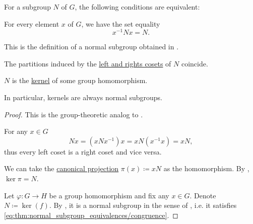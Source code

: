 \begin{proposition}\label{thm:normal_subgroup_equivalences}
  For a subgroup \( N \) of \( G \), the following conditions are equivalent:
  \begin{thmenum}
     For every element \( x \) of \( G \), we have the set equality
    \begin{equation}\label{eq:thm:normal_subgroup_equivalences/congruence}
      x^{-1} N x = N.
    \end{equation}

    This is the definition of a normal subgroup obtained in .

     The partitions induced by the \hyperref[def:subgroup_cosets]{left and rights cosets} of \( N \) coincide.

     \( N \) is the \hyperref[thm:group_kernels]{kernel} of some group homomorphism.
  \end{thmenum}

  In particular, kernels are always normal subgroups.
\end{proposition}
\begin{proof}
  This is the group-theoretic analog to .

   For any \( x \in G \)
  \begin{equation*}
    N x = (x N x^{-1})x = x N(x^{-1}x) = x N,
  \end{equation*}
  thus every left coset is a right coset and vice versa.

   We can take the \hyperref[def:group/quotient]{canonical projection} \( \pi(x) \coloneqq x N \) as the homomorphism. By , \( \ker \pi = N \).

   Let \( \varphi: G \to H \) be a group homomorphism and fix any \( x \in G \). Denote \( N \coloneqq \ker(f) \). By , it is a normal subgroup in the sense of , i.e. it satisfies \eqref{eq:thm:normal_subgroup_equivalences/congruence}.
\end{proof}

